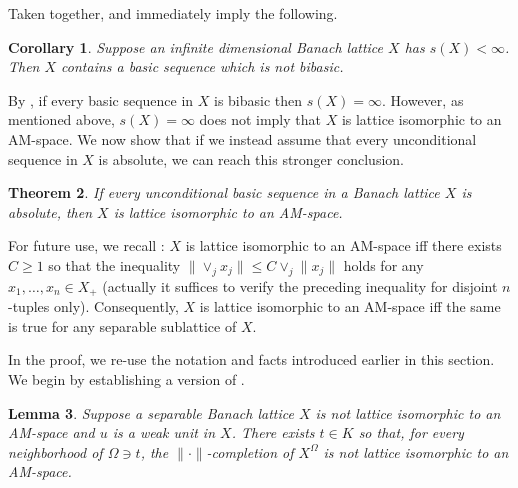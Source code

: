 \documentclass[12pt,leqno]{amsart}
\newtheorem{theorem}{Theorem}[section]
\newtheorem{corollary}[theorem]{Corollary}
\newtheorem{lemma}[theorem]{Lemma}
\numberwithin{equation}{section}
\theoremstyle{definition}
\begin{document}
Taken together,  and  immediately imply the following.

\begin{corollary}\label{c:general basis destruction}
 Suppose an infinite dimensional Banach lattice $X$ has $s(X)< \infty$.
 Then $X$ contains a basic sequence which is not bibasic.
\end{corollary}
By , if every basic sequence in $X$ is bibasic then $s(X)=\infty.$ However, as mentioned above, $s(X)=\infty$ does not imply that $X$ is lattice isomorphic to an AM-space. We now show that if we instead  assume that every unconditional sequence in $X$ is absolute, we can reach this stronger conclusion.
\begin{theorem}\label{p:uncond_not_absolute}
If every unconditional basic sequence in a Banach lattice $X$ is absolute, then $X$ is lattice isomorphic to an AM-space.
\end{theorem}

For future use, we recall \cite[Theorem 2.1.12]{MN}: $X$ is lattice isomorphic to an AM-space iff there exists $C \geq 1$ so that the inequality $\| \vee_j x_j \| \leq C \vee_j \|x_j\|$ holds for any $x_1, \ldots, x_n \in X_+$ (actually it suffices to verify the preceding inequality for disjoint $n$-tuples only).
Consequently, $X$ is lattice isomorphic to an AM-space iff the same is true for any separable sublattice of $X$.
\medskip

In the proof, we re-use the notation and facts introduced earlier in this section. We begin by establishing a version of .

\begin{lemma}\label{l:not AM}
Suppose a separable Banach lattice $X$ is not lattice isomorphic to an AM-space and $u$ is a weak unit in $X$.
There exists $t \in K$ so that, for every neighborhood of $\Omega \ni t$, the $\| \cdot \|$-completion of $X^\Omega$ is not lattice isomorphic to an AM-space.
\end{lemma}
\end{document}
